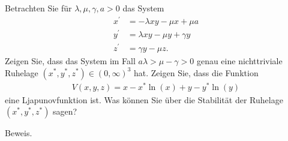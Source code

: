 \begin{exercise}
Betrachten Sie für $\lambda, \mu, \gamma, a > 0$ das System
\begin{align*}
  x^{\prime} &= - \lambda xy - \mu x + \mu a \\
  y^{\prime} &= \lambda xy - \mu y + \gamma y \\
  z^{\prime} &= \gamma y - \mu z.
\end{align*}
Zeigen Sie, dass das System im Fall $a\lambda > \mu - \gamma > 0$ genau eine
nichttriviale Ruhelage $(x^*,y^*,z^*) \in (0,\infty)^3$ hat. Zeigen Sie, dass
die Funktion
\begin{align*}
  V(x,y,z) = x - x^*\ln(x) + y - y^*\ln(y)
\end{align*}
eine Ljapunovfunktion ist. Was können Sie über die Stabilität der Ruhelage $(x^*,y^*,z^*)$
sagen?
\end{exercise}

\begin{solution}
Beweis.
\end{solution}
